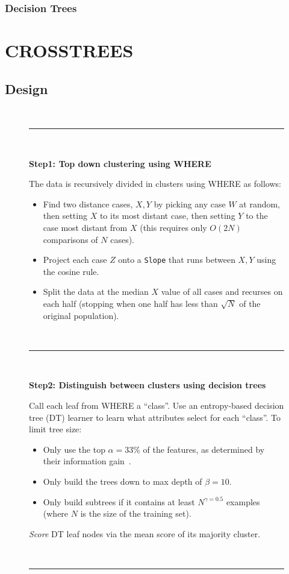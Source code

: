 \documentclass{sig-alternate}
\newcommand{\bi}{\begin{itemize}[leftmargin=0.4cm]}
\newcommand{\ei}{\end{itemize}}
\begin{document}
\subsubsection{Decision Trees}

\section{CROSSTREES}
\subsection{Design}
	\begin{figure}[t]
		\small
		~\hrule~
		
		{\bf Step1: Top down clustering using WHERE}
		
		The data is recursively divided in clusters using WHERE as follows:
		\begin{itemize}
			
			\item Find   two   distance cases,  $X,Y$
			by picking any case $W$ at random, then setting $X$ to its most
			distant case, then setting $Y$ to the case most distant from
			$X$
			(this requires only $O(2N)$ comparisons
			of $N$ cases).
			\item Project each case $Z$
			onto a {\tt Slope} that  runs between $X,Y$ using the cosine
			rule. 
			\item Split the data at the median $X$ value of all cases and
			recurses on each half  (stopping when
			one half has less  than $\sqrt{N}$ of the original population).
		\end{itemize}
		~\hrule~
		
		{\bf Step2: Distinguish between clusters using  decision trees}
		
		Call each leaf from WHERE a  ``class''. Use an entropy-based
		 decision tree (DT) learner to learn what attributes select for each ``class''. To limit tree size:
		 \bi
		 \item Only use the top $\alpha=33$\%  of the features, as determined by their information gain~\cite{Irani1993}. 
		 \item Only build the trees down to  max depth of $\beta=10$.
		 \item Only build subtrees if it contains at least $N^{\gamma=0.5}$ examples (where $N$ is the size of the training set).
\ei
{\em Score}  DT  leaf nodes  via the mean score of its majority cluster. 
		
		~\hrule~
		

\end{figure}
\end{document}
